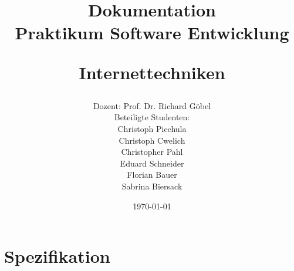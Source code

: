 \documentclass[11pt,dvipsnames]{scrreprt}%
\title{Dokumentation\\
Praktikum Software Entwicklung

Internettechniken}
\author{Dozent: Prof. Dr. Richard Göbel \\
Beteiligte Studenten: \\
Christoph Piechula \\
Christoph Cwelich \\
Christopher Pahl\\
Eduard Schneider \\
Florian Bauer \\
Sabrina Biersack \\
}
\date{\today}
\begin{document}
\graphicspath{
{./analyse/img/}
}
\maketitle

\tableofcontents

\part{Spezifikation}

\end{document}
